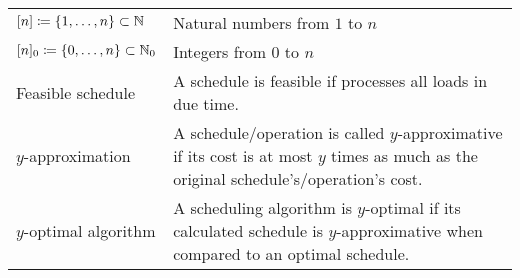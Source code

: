 \begin{table}[H]
\begin{tabularx}{\textwidth}{ | >{\centering\arraybackslash}X | >{\arraybackslash}m{} | }
  \hline \multicolumn{2}{|c|}{\textbf{\large Miscellaneous}} \\  
  \hline $[n]\coloneqq\{1,\dotsc,n\}\subset\mathbb{N}$&Natural numbers from $1$ to $n$\\
  \hline $[n]_0\coloneqq\{0,\dotsc,n\}\subset\mathbb{N}_0$&Integers from $0$ to $n$\\
  \hline Feasible schedule&A schedule is feasible if processes all loads in due time.\\
  \hline $y$-approximation&A schedule/operation is called $y$-approximative if its cost is at most $y$ times as much as the original schedule's/operation's cost.\\
  \hline $y$-optimal algorithm&A scheduling algorithm is $y$-optimal if its calculated schedule is $y$-approximative when compared to an optimal schedule.\\
  \hline
\end{tabularx}
\end{table}
